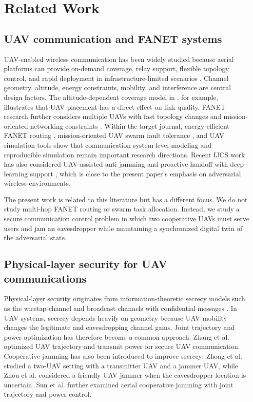 \section{Related Work}
\label{sec:related}

\subsection{UAV communication and FANET systems}

UAV-enabled wireless communication has been widely studied because aerial platforms can provide on-demand coverage, relay support, flexible topology control, and rapid deployment in infrastructure-limited scenarios \cite{zeng2016uav,mozaffari2019tutorial}. Channel geometry, altitude, energy constraints, mobility, and interference are central design factors. The altitude-dependent coverage model in \cite{alhourani2014optimal}, for example, illustrates that UAV placement has a direct effect on link quality. FANET research further considers multiple UAVs with fast topology changes and mission-oriented networking constraints \cite{lakew2020fanet}. Within the target journal, energy-efficient FANET routing \cite{oubbati2019ecad}, mission-oriented UAV swarm fault tolerance \cite{wang2021fault}, and UAV simulation tools \cite{jiang2024simulation} show that communication-system-level modeling and reproducible simulation remain important research directions.
Recent IJCS work has also considered UAV-assisted anti-jamming and proactive handoff with deep-learning support \cite{unnisa2023antijamming}, which is close to the present paper's emphasis on adversarial wireless environments.

The present work is related to this literature but has a different focus. We do not study multi-hop FANET routing or swarm task allocation. Instead, we study a secure communication control problem in which two cooperative UAVs must serve users and jam an eavesdropper while maintaining a synchronized digital twin of the adversarial state.

\subsection{Physical-layer security for UAV communications}

Physical-layer security originates from information-theoretic secrecy models such as the wiretap channel \cite{wyner1975wiretap} and broadcast channels with confidential messages \cite{csiszar1978broadcast}. In UAV systems, secrecy depends heavily on geometry because UAV mobility changes the legitimate and eavesdropping channel gains. Joint trajectory and power optimization has therefore become a common approach. Zhang et al. \cite{zhang2019securing} optimized UAV trajectory and transmit power for secure UAV communication. Cooperative jamming has also been introduced to improve secrecy; Zhong et al. \cite{zhong2019cooperative} studied a two-UAV setting with a transmitter UAV and a jammer UAV, while Zhou et al. \cite{zhou2018unknown} considered a friendly UAV jammer when the eavesdropper location is uncertain. Sun et al. \cite{sun2019aerial} further examined aerial cooperative jamming with joint trajectory and power control.

